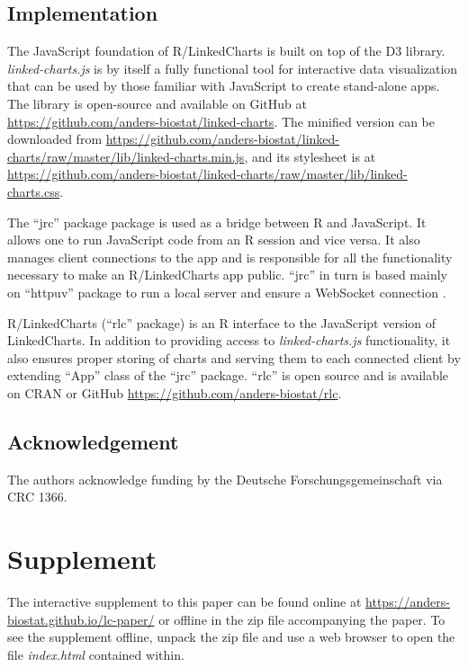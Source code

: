 \documentclass[twocolumn,10pt]{article}
\begin{document}
\subsection{Implementation}

The JavaScript foundation of R/LinkedCharts is built on top of the D3 \citep{bostock_2011} library. \emph{linked-charts.js} is by itself a fully functional tool for interactive data visualization that can be used by those familiar with JavaScript to create stand-alone apps. The library is open-source and available on GitHub at \url{https://github.com/anders-biostat/linked-charts}. The minified version can be downloaded from \url{https://github.com/anders-biostat/linked-charts/raw/master/lib/linked-charts.min.js}, and its stylesheet is at \url{https://github.com/anders-biostat/linked-charts/raw/master/lib/linked-charts.css}.

The ``jrc'' package \citep{jrc_2020} package is used as a bridge between R and JavaScript. It allows one to run JavaScript code from an R session and vice versa. It also manages client connections to the app and is responsible for all the functionality necessary to make an R/LinkedCharts app public. ``jrc'' in turn is based mainly on ``httpuv'' \citep{cheng_2020} package to run a local server and ensure a WebSocket connection \citep{fette_rfc_2011}. 

R/LinkedCharts (``rlc'' package) is an R \citep{R_2019} interface to the JavaScript version of LinkedCharts. In addition to providing access to \emph{linked-charts.js} functionality, it also ensures proper storing of charts and serving them to each connected client by extending ``App'' class of the ``jrc'' package. ``rlc'' is open source and is available on CRAN or GitHub \url{https://github.com/anders-biostat/rlc}.

\subsection{Acknowledgement}

The authors acknowledge funding by the Deutsche Forschungsgemeinschaft via CRC 1366.

\section{Supplement}

The interactive supplement to this paper can be found online at \url{https://anders-biostat.github.io/lc-paper/} or offline in the zip file accompanying the paper. To see the supplement offline, unpack the zip file and use a web browser to open the file \emph{index.html} contained within.


\begin{small} 

\end{small}
\end{document}
